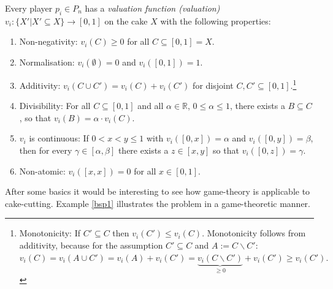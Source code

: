 Every player $p_i\in P_n$ has a \emph{valuation function (valuation)} $v_i:\{X'|X' \subseteq X\} \rightarrow [0,1]$ on the cake $X$ with the following properties:
\begin{enumerate}
\item Non-negativity: $v_i(C)\geq 0$ for all $C\subseteq [0,1]=X.$
\item Normalisation: $v_i(\emptyset)=0$ and $v_i([0,1])=1.$
\item Additivity: $v_i(C \cup C')=v_i(C)+v_i(C')$ for disjoint
$C,C'\subseteq [0,1].$\footnote{Monotonicity: If $C' \subseteq C$ then $v_i(C') \leq v_i(C)$. Monotonicity follows from additivity, because for the assumption $C' \subseteq C$ and $A:=C\backslash C'$: $v_i(C)=v_i(A\cup C')=v_i(A)+v_i(C')=\underbrace{v_i(C\backslash C')}_{\geq 0}+v_i(C')\geq v_i(C').$}
\item Divisibility: For all $C\subseteq [0,1]$ and all $\alpha \in
\mathbb{R}$, $0\leq \alpha \leq 1$, there exists a $B\subseteq C$, so that
$v_i(B)=\alpha \cdot v_i(C).$
\item  $v_i$ is continuous: If $0<x<y\leq 1$ with $v_i([0,x])=\alpha$ and
$v_i([0,y])=\beta$, then for every $\gamma \in [\alpha,\beta]$ there exists a $z \in [x,y]$ so that $v_i([0,z])=\gamma.$
\item Non-atomic:  $v_i([x,x])=0$ for all $x\in [0,1].$
\end{enumerate}
After some basics it would be interesting to see how game-theory is applicable to cake-cutting. Example \ref{bsp1} illustrates the problem in a game-theoretic manner.
%
